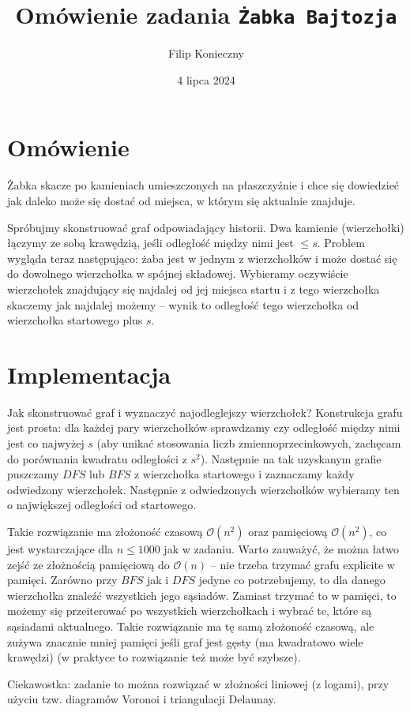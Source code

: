 \documentclass[]{article}
\author{Filip Konieczny}
\date{4 lipca 2024}
\title{Omówienie zadania \texttt{Żabka Bajtozja}}
\newcommand{\Oh}[1]{\mathcal{O}{\left(#1\right)}}
\begin{document}
\maketitle
\section{Omówienie}

Żabka skacze po kamieniach umieszczonych na płaszczyźnie i chce się dowiedzieć jak daleko może się dostać od miejsca, w którym się aktualnie znajduje.

Spróbujmy skonstruować graf odpowiadający historii. Dwa kamienie (wierzchołki) łączymy ze sobą krawędzią, jeśli odległość między nimi jest $\leq s$. Problem wygląda teraz następująco: żaba jest w jednym z wierzchołków i może dostać się do dowolnego wierzchołka w spójnej składowej. Wybieramy oczywiście wierzchołek znajdujący się najdalej od jej miejsca startu i z tego wierzchołka skaczemy jak najdalej możemy -- wynik to odległość tego wierzchołka od wierzchołka startowego plus $s$.


\section{Implementacja}

Jak skonstruować graf i wyznaczyć najodleglejszy wierzchołek? Konstrukcja grafu jest prosta: dla każdej pary wierzchołków sprawdzamy czy odległość między nimi jest co najwyżej $s$ (aby unikać stosowania liczb zmiennoprzecinkowych, zachęcam do porównania kwadratu odległości z $s^2$). Następnie na tak uzyskanym grafie puszczamy $DFS$ lub $BFS$ z wierzchołka startowego i zaznaczamy każdy odwiedzony wierzchołek. Następnie z odwiedzonych wierzchołków wybieramy ten o największej odległości od startowego.

Takie rozwiązanie ma złożoność czasową $\Oh{n^2}$ oraz pamięciową $\Oh{n^2}$, co jest wystarczające dla $n \leq 1000$ jak w zadaniu. Warto zauważyć, że można łatwo zejść ze złożnością pamięciową do $\Oh{n}$ -- nie trzeba trzymać grafu explicite w pamięci. Zarówno przy $BFS$ jak i $DFS$ jedyne co potrzebujemy, to dla danego wierzchołka znaleźć wszystkich jego sąsiadów. Zamiast trzymać to w pamięci, to możemy się przeiterować po wszystkich wierzchołkach i wybrać te, które są sąsiadami aktualnego. Takie rozwiązanie ma tę samą złożoność czasową, ale zużywa znacznie mniej pamięci jeśli graf jest gęsty (ma kwadratowo wiele krawędzi) (w praktyce to rozwiązanie też może być szybsze).

Ciekawostka: zadanie to można rozwiązać w złożności liniowej (z logami), przy użyciu tzw. diagramów Voronoi i triangulacji Delaunay.
\end{document}
